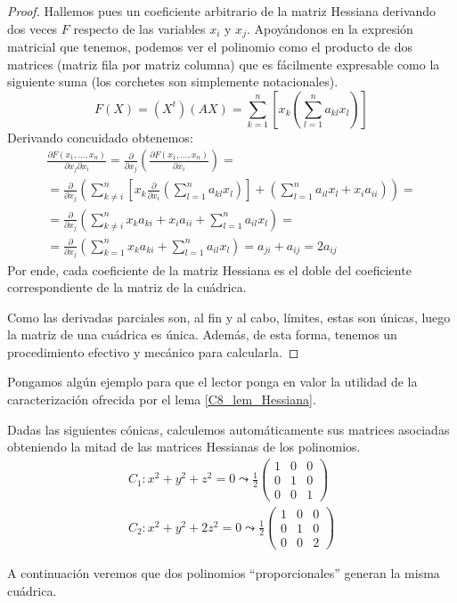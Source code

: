 \begin{proof}
Hallemos pues un coeficiente arbitrario de la matriz Hessiana derivando dos veces $F$ respecto de las variables $x_i$ y $x_j$. Apoyándonos en la expresión matricial que tenemos, podemos ver el polinomio como el producto de dos matrices (matriz fila por matriz columna) que es fácilmente expresable como la siguiente suma (los corchetes son simplemente notacionales).
\[F(X)=(X^t)(AX)=\sum_{k=1}^{n}\left[x_k\left(\sum_{l=1}^{n}a_{kl}x_l\right)\right]\]
Derivando concuidado obtenemos:
\begin{multline}
	\frac{\partial F(x_1,\dots,x_n)}{\partial x_j\partial x_i}=\frac{\partial}{\partial x_j}\left(\frac{\partial F(x_1,\dots,x_n)}{\partial x_i}\right)=\\=\frac{\partial}{\partial x_j}\left(\sum_{k\not= i}^{n}\left[x_k\frac{\partial}{\partial x_i}\left(\sum_{l=1}^{n}a_{kl}x_l\right)\right]+\left(\sum_{l=1}^{n}a_{il}x_l+x_ia_{ii}\right)\right)=\\
	=\frac{\partial}{\partial x_j}\left(\sum_{k\not=i}^{n}x_ka_{ki}+x_ia_{ii}+\sum_{l=1}^{n}a_{il}x_l\right)=\\=\frac{\partial}{\partial x_j}\left(\sum_{k=1}^{n}x_ka_{ki}+\sum_{l=1}^{n}a_{il}x_l\right)=a_{ji}+a_{ij}=2a_{ij}
\end{multline}
Por ende, cada coeficiente de la matriz Hessiana es el doble del coeficiente correspondiente de la matriz de la cuádrica.

Como las derivadas parciales son, al fin y al cabo, límites, estas son únicas, luego la matriz de una cuádrica es única. Además, de esta forma, tenemos un procedimiento efectivo y mecánico para calcularla.
\end{proof}
Pongamos algún ejemplo para que el lector ponga en valor la utilidad de la caracterización ofrecida por el lema \ref{C8_lem_Hessiana}.
\begin{exa}
	Dadas las siguientes cónicas, calculemos automáticamente sus matrices asociadas obteniendo la mitad de las matrices Hessianas de los polinomios.
	\[\begin{array}{c}
	C_1:x^2+y^2+z^2=0\leadsto\frac{1}{2}\begin{pmatrix}
	1 & 0 & 0\\
	0 & 1 & 0\\
	0 & 0 & 1
	\end{pmatrix}\\
	C_2:x^2+y^2+2z^2=0\leadsto\frac{1}{2}\begin{pmatrix}
	1 & 0 & 0\\
	0 & 1 & 0\\
	0 & 0 & 2
	\end{pmatrix}
	\end{array}\]
\end{exa}
A continuación veremos que dos polinomios ``proporcionales'' generan la misma cuádrica.

